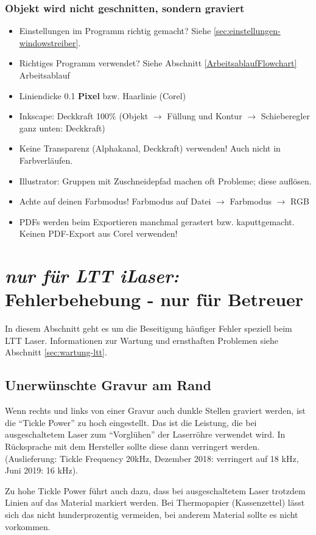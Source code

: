 \documentclass{\basedir/fablab-document}
\newcommand{\nurLTT}{\emph{nur für LTT iLaser:} }
\begin{document}
	\subsubsection{Objekt wird nicht geschnitten, sondern graviert}
	\begin{itemize}
		\item Einstellungen im Programm richtig gemacht? Siehe \cref{sec:einstellungen-windowstreiber}.
		\item Richtiges Programm verwendet? Siehe Abschnitt \ref{ArbeitsablaufFlowchart} Arbeitsablauf
		\item Liniendicke 0.1 \textbf{Pixel} bzw. Haarlinie (Corel)
		\item Inkscape: Deckkraft 100\% (Objekt $\rightarrow$ Füllung und Kontur $\rightarrow$ Schieberegler ganz unten: Deckkraft)
		\item Keine Transparenz (Alphakanal, Deckkraft) verwenden! Auch nicht in Farbverläufen.
		\item Illustrator: Gruppen mit Zuschneidepfad machen oft Probleme; diese auflösen.
		\item Achte auf deinen Farbmodus! Farbmodus auf Datei $\rightarrow$ Farbmodus $\rightarrow$ RGB
		\item PDFs werden beim Exportieren manchmal gerastert bzw. kaputtgemacht. Keinen PDF-Export aus Corel verwenden!
	\end{itemize}

	\section{\nurLTT Fehlerbehebung - nur für Betreuer}
	In diesem Abschnitt geht es um die Beseitigung häufiger Fehler speziell beim LTT Laser.
	Informationen zur Wartung und ernsthaften Problemen siehe Abschnitt \ref{sec:wartung-ltt}.


	\subsection{Unerwünschte Gravur am Rand}
	Wenn rechts und links von einer Gravur auch dunkle Stellen graviert werden, ist die \enquote{Tickle Power} zu hoch eingestellt. Das ist die Leistung, die bei ausgeschaltetem Laser zum \enquote{Vorglühen} der Laserröhre verwendet wird. In Rücksprache mit dem Hersteller sollte diese dann verringert werden. (Auslieferung: Tickle Frequency 20kHz, Dezember 2018: verringert auf 18 kHz, Juni 2019: 16 kHz).

	Zu hohe Tickle Power führt auch dazu, dass bei ausgeschaltetem Laser trotzdem Linien auf das Material markiert werden. Bei Thermopapier (Kassenzettel) lässt sich das nicht hunderprozentig vermeiden, bei anderem Material sollte es nicht vorkommen.
\end{document}
